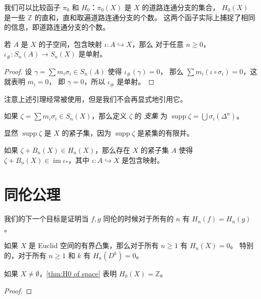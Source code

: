 \documentclass[fontset=none]{Notes}
\DeclareMathOperator\im{im}
\DeclareMathOperator\supp{supp}
\begin{document}
我们可以比较函子 $\pi_0$ 和 $H_0$：$\pi_0(X)$ 是 $X$ 的道路连通分支的集合，
$H_0(X)$ 是一些 $\mathbb{Z}$ 的直和，直和取遍道路连通分支的个数。
这两个函子实际上捕捉了相同的信息，即道路连通分支的个数。

\begin{lemma}
  若 $A$ 是 $X$ 的子空间，包含映射 $\iota:A\hookrightarrow X$，那么
  对于任意 $n\geq 0$，$\iota_\#:S_n(A)\to S_n(X)$ 是单射。
\end{lemma}
\begin{proof}
  设 $\gamma=\sum m_i\sigma_i\in S_n(A)$ 使得 $\iota_\#(\gamma)=0$，
  那么 $\sum m_i(\iota\circ\sigma_i)=0$，这就表明 $m_i=0$，
  即 $\gamma=0$，所以 $\iota_\#$ 是单射。
\end{proof}

注意上述引理经常被使用，但是我们不会再显式地引用它。

\begin{definition}
  如果 $\zeta=\sum m_i\sigma_i\in S_n(X)$，那么定义 $\zeta$ 的
  \emph{支集} 为 $\supp\zeta=\bigcup \sigma_i(\Delta^n)$。
\end{definition}

显然 $\supp\zeta$ 是 $X$ 的紧子集，因为 $\supp\zeta$ 是紧集的有限并。

\begin{theorem}
  如果 $\zeta+B_n(X)\in H_n(X)$，那么存在 $X$ 的紧子集 $A$ 使得
  $\zeta+B_n(X)\in\im\iota_*$，其中 $\iota:A\hookrightarrow X$ 是包含映射。
\end{theorem}

\section{同伦公理}

我们的下一个目标是证明当 $f,g$ 同伦的时候对于所有的 $n$
有 $H_n(f)=H_n(g)$。

\begin{theorem}
  如果 $X$ 是 Euclid 空间的有界凸集，那么对于所有 $n\geq 1$ 有 $H_n(X)=0$。
  特别的，对于所有 $n\geq 1$ 和 $k$ 有 $H_n(D^k)=0$。
\end{theorem}
\begin{remark}
  如果 $X\neq\emptyset$，\autoref{thm:H0 of space} 表明 $H_0(X)=\mathbb{Z}$。
\end{remark}
\begin{proof}
  
\end{proof}
\end{document}
